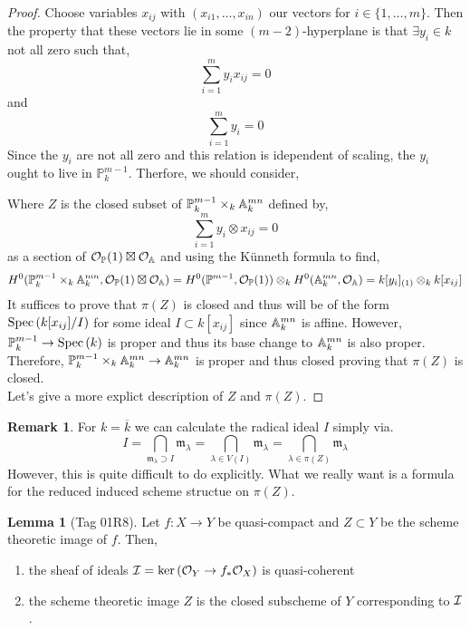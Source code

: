 \documentclass[12pt]{extarticle}
\theoremstyle{definition}
\newtheorem{lemma}[theorem]{Lemma}
\newtheorem{remark}{Remark}
\newcommand{\m}{\mathfrak{m}}
\renewcommand{\P}{\mathbb{P}}
\begin{document}
\begin{proof}
Choose variables $x_{ij}$ with $(x_{i1}, \dots, x_{in})$ our vectors for $i \in \{ 1, \dots, m \}$. Then the property that these vectors lie in some $(m-2)$-hyperplane is that $\exists y_i \in k$ not all zero such that,
\[ \sum_{i = 1}^m y_i x_{ij} = 0 \] 
and
\[ \sum_{i = 1}^m y_i = 0 \]
Since the $y_i$ are not all zero and this relation is idependent of scaling, the $y_i$ ought to live in $\P^{m-1}_k$. Therfore, we should consider,
\begin{center}
\end{center}
Where $Z$ is the closed subset of $\P^{m-1}_k \times_k \A^{mn}_k$ defined by,
\[ \sum_{i = 1}^m y_i \otimes x_{ij} = 0 \]
as a section of $\struct{\P}(1) \boxtimes \struct{\A}$ and using the K\"{u}nneth formula to find,
\[ H^0(\P^{m - 1}_k \times_k \A^{mn}_k, \struct{\P}(1) \boxtimes \struct{\A}) = H^0(\P^{m - 1}, \struct{\P}(1)) \otimes_k H^0(\A^{mn}_k, \struct{\A}) = k[y_i]_{(1)} \otimes_k k[x_{ij}]  \]
It suffices to prove that $\pi(Z)$ is closed and thus will be of the form $\mathrm{Spec}\left(k[x_{ij}]/I\right)$ for some ideal $I \subset k[x_{ij}]$ since $\mathbb{A}^{mn}_k$ is affine. However, $\P^{m-1}_k \to \Spec{k}$ is proper and thus its base change to $\mathbb{A}^{mn}_k$ is also proper. Therefore, $\P^{m-1}_k \times_k \A^{mn}_k \to \A^{mn}_k$ is proper and thus closed proving that $\pi(Z)$ is closed.
\bigskip\\
Let's give a more explict description of $Z$ and $\pi(Z)$. 
\end{proof}

\begin{remark}
For $k = \overline{k}$ we can calculate the radical ideal $I$ simply via.
\[ I = \bigcap_{\m_\lambda \supset I} \m_\lambda = \bigcap_{\lambda \in V(I)} \m_\lambda = \bigcap_{\lambda \in \pi(Z)} \m_{\lambda} \]
However, this is quite difficult to do explicitly. What we really want is a formula for the reduced induced scheme structue on $\pi(Z)$. 
\end{remark}

\begin{lemma}[Tag 01R8]
Let $f : X \to Y$ be quasi-compact and $Z \subset Y$ be the scheme theoretic image of $f$. Then,
\begin{enumerate}
\item the sheaf of ideals $\mathcal{I} = \ker{(\mathcal{O}_{Y} \to f_* \mathcal{O}_{X})}$ is quasi-coherent
\item the scheme theoretic image $Z$ is the closed subscheme of $Y$ corresponding to $\mathcal{I}$.
\end{enumerate}
\end{lemma}
\end{document}
